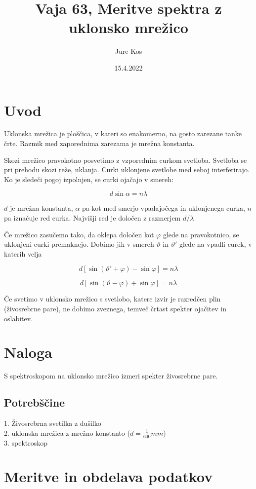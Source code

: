 \documentclass[a4paper]{report}
\author{Jure Kos}
\title{Vaja 63, Meritve spektra z uklonsko mrežico}
\date{15.4.2022}
\begin{document}
\maketitle

\chapter*{Uvod}
Uklonska mrežica je ploščica, v kateri so enakomerno, na gosto zarezane tanke črte. Razmik med zaporednima zarezama je mrežna konstanta.

Skozi mrežico pravokotno posvetimo z vzporednim curkom svetloba. Svetloba se pri prehodu skozi reže, uklanja. Curki uklonjene svetlobe med seboj interferirajo. Ko je sledeči pogoj izpolnjen, se curki ojačajo v smereh:

\[d  \sin \alpha = n  \lambda\]

$d$ je mrežna konstanta, $\alpha$ pa kot med smerjo vpadajočega in uklonjenega curka, $n$ pa iznačuje red curka. Najvišji red je določen z razmerjem $d / \lambda$

Če mrežico zasučemo tako, da oklepa določen kot $\varphi$ glede na pravokotnico, se uklonjeni curki premaknejo. Dobimo jih v smereh $\vartheta$ in $\vartheta ' $ glede na vpadli curek, v katerih velja

\[d [\sin(\vartheta' + \varphi) - \sin \varphi] = n\lambda\]

\[d [\sin(\vartheta - \varphi) + \sin \varphi] = n\lambda\]

Če svetimo v uklonsko mrežico s svetlobo, katere izvir je razredčen plin (živosrebrne pare), ne dobimo zveznega, temveč črtast spekter ojačitev in  oslabitev. 



\chapter*{Naloga}

S spektroskopom na uklonsko mrežico izmeri spekter živosrebrne pare.

\section*{Potrebščine}
1. Živosrebrna svetilka z dušilko\\
2. uklonska mrežica z mrežno konstanto ($d = \frac{1}{600}mm$)\\
3. spektroskop

\chapter*{Meritve in obdelava podatkov}
\end{document}
